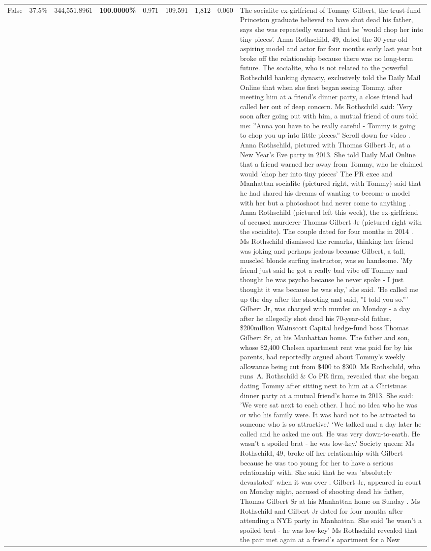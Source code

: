\begin{table}[H]
\begin{tabular}{lllrlllll}
False & 37.5\% & 344,551.8961 & \bfseries \color{red} 100.0000\% & 0.971 & 109.591 & 1,812 & 0.060 & The socialite ex-girlfriend of Tommy Gilbert, the trust-fund Princeton graduate believed to have shot dead his father, says she was repeatedly warned that he 'would chop her into tiny pieces'. Anna Rothschild, 49, dated the 30-year-old aspiring model and actor for four months early last year but broke off the relationship because there was no long-term future. The socialite, who is not related to the powerful Rothschild banking dynasty, exclusively told the Daily Mail Online that when she first began seeing Tommy, after meeting him at a friend's dinner party, a close friend had called her out of deep concern. Ms Rothschild said: 'Very soon after going out with him, a mutual friend of ours told me: ''Anna you have to be really careful - Tommy is going to chop you up into little pieces.'' Scroll down for video . Anna Rothschild, pictured with Thomas Gilbert Jr, at a New Year's Eve party in 2013. She told Daily Mail Online that a friend warned her away from Tommy, who he claimed would 'chop her into tiny pieces' The PR exec and Manhattan socialite (pictured right, with Tommy) said that he had shared his dreams of wanting to become a model with her but a photoshoot had never come to anything . Anna Rothschild (pictured left this week), the ex-girlfriend of accused murderer Thomas Gilbert Jr (pictured right with the socialite). The couple dated for four months in 2014 . Ms Rothschild dismissed the remarks, thinking her friend was joking and perhaps jealous because Gilbert, a tall, muscled blonde surfing instructor, was so handsome. 'My friend just said he got a really bad vibe off Tommy and thought he was psycho because he never spoke - I just thought it was because he was shy,' she said. 'He called me up the day after the shooting and said, ''I told you so.''' Gilbert Jr, was charged with murder on Monday - a day after he allegedly shot dead his 70-year-old father, \$200million Wainscott Capital hedge-fund boss Thomas Gilbert Sr, at his Manhattan home. The father and son, whose \$2,400 Chelsea apartment rent was paid for by his parents, had reportedly argued about Tommy's weekly allowance being cut from \$400 to \$300. Ms Rothschild, who runs A. Rothschild \& Co PR firm, revealed that she began dating Tommy after sitting next to him at a Christmas dinner party at a mutual friend's home in 2013. She said: 'We were sat next to each other. I had no idea who he was or who his family were. It was hard not to be attracted to someone who is so attractive.' ‘We talked and a day later he called and he asked me out. He was very down-to-earth. He wasn’t a spoiled brat - he was low-key.’ Society queen: Ms Rothschild, 49, broke off her relationship with Gilbert because he was too young for her to have a serious relationship with. She said that he was 'absolutely devastated' when it was over . Gilbert Jr, appeared in court on Monday night, accused of shooting dead his father, Thomas Gilbert Sr at his Manhattan home on Sunday . Ms Rothschild and Gilbert Jr dated for four months after attending a NYE party in Manhattan. She said 'he wasn't a spoiled brat - he was low-key' Ms Rothschild revealed that the pair met again at a friend’s apartment for a New 
\end{tabular}
\end{table}
